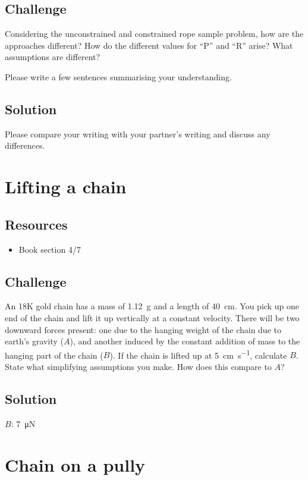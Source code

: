 \subsection*{Challenge}
Considering the unconstrained and constrained rope sample problem, how are the approaches different? How do the different values for ``P'' and ``R'' arise? What assumptions are different?

Please write a few sentences summarising your understanding.

\subsection*{Solution}
Please compare your writing with your partner's writing and discuss any differences.



\iffalse
\newpage
\section{Lifting a chain}

\subsection*{Resources}
\begin{itemize}
    \item Book section 4/7
\end{itemize}

\subsection*{Challenge}
An 18K gold chain has a mass of \SI{1.12}{\gram} and a length of \SI{40}{\cm}. You pick up one end of the chain and lift it up vertically at a constant velocity. There will be two downward forces present: one due to the hanging weight of the chain due to earth's gravity ($A$), and another induced by the constant addition of mass to the hanging part of the chain ($B$). If the chain is lifted up at \SI{5}{\cm\per\s}, calculate $B$. State what simplifying assumptions you make. How does this compare to $A$?

\subsection*{Solution}
$B$: \SI{7}{\micro\newton}




\newpage
\section{Chain on a pully}


